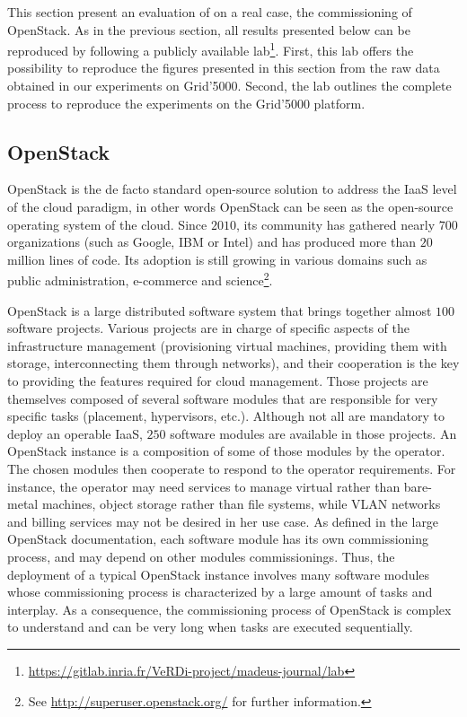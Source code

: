 \graphicspath{{images/}}

This section present an evaluation of \mad on a real case, the
commissioning of OpenStack. As in the previous section, all results
presented below can be reproduced by following a publicly available
lab\footnote{\url{https://gitlab.inria.fr/VeRDi-project/madeus-journal/lab}}. First,
this lab offers the possibility to reproduce the figures presented in
this section from the raw data obtained in our experiments on
Grid'5000. Second, the lab outlines the complete process to reproduce
the experiments on the Grid'5000 platform.

\subsection{OpenStack}
\label{subsec:openstack}

OpenStack is the de facto standard open-source solution to address the
IaaS level of the cloud paradigm, in other words OpenStack can be seen
as the open-source operating system of the cloud. Since $2010$, its
community has gathered nearly $700$ organizations (such as Google, IBM
or Intel) and has produced more than $20$ million lines of code. Its
adoption is still growing in various domains such as public
administration, e-commerce and
science\footnote{See \url{http://superuser.openstack.org/} for further
information.}.

OpenStack is a large distributed software system that brings together
almost $100$ software projects. Various projects are in charge of
specific aspects of the infrastructure management (\eg provisioning
virtual machines, providing them with storage, interconnecting them
through networks), and their cooperation is the key to providing the
features required for cloud management.
%
Those projects are themselves composed of several software modules
that are responsible for very specific tasks (\eg placement,
hypervisors, etc.). Although not all are mandatory to deploy an
operable IaaS, $250$ software modules are available in those projects.
%
An OpenStack instance is a composition of some of those modules by the
operator. The chosen modules then cooperate to respond to the operator
requirements. For instance, the operator may need services to manage
virtual rather than bare-metal machines, object storage rather than
file systems, while VLAN networks and billing services may not be
desired in her use case. As defined in the large OpenStack
documentation, each software module has its own commissioning process,
and may depend on other modules commissionings.
%
Thus, the deployment of a typical OpenStack instance involves many
software modules whose commissioning process is characterized by a
large amount of tasks and interplay. As a consequence, the
commissioning process of OpenStack is complex to understand and can be
very long when tasks are executed sequentially.

